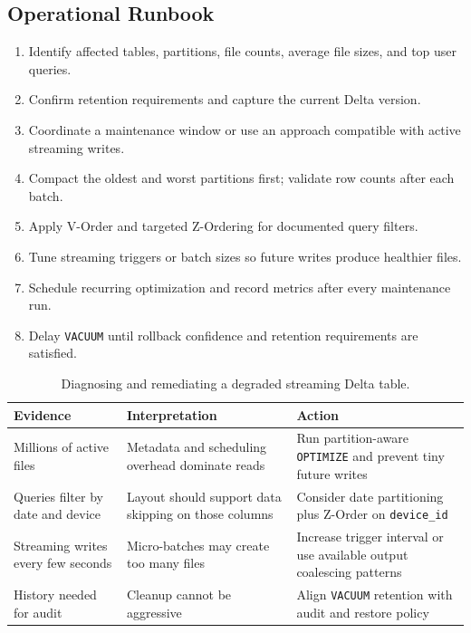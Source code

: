 \subsection{Operational Runbook}
\begin{enumerate}
    \item Identify affected tables, partitions, file counts, average file sizes, and top user queries.
    \item Confirm retention requirements and capture the current Delta version.
    \item Coordinate a maintenance window or use an approach compatible with active streaming writes.
    \item Compact the oldest and worst partitions first; validate row counts after each batch.
    \item Apply V-Order and targeted Z-Ordering for documented query filters.
    \item Tune streaming triggers or batch sizes so future writes produce healthier files.
    \item Schedule recurring optimization and record metrics after every maintenance run.
    \item Delay \texttt{VACUUM} until rollback confidence and retention requirements are satisfied.
\end{enumerate}

\begin{table}[H]
\centering
\small
\begin{tabular}{@{}p{3.4cm}p{4.8cm}p{4.8cm}@{}}
\toprule
\textbf{Evidence} & \textbf{Interpretation} & \textbf{Action} \\
\midrule
Millions of active files & Metadata and scheduling overhead dominate reads & Run partition-aware \texttt{OPTIMIZE} and prevent tiny future writes \\
Queries filter by date and device & Layout should support data skipping on those columns & Consider date partitioning plus Z-Order on \texttt{device\_id} \\
Streaming writes every few seconds & Micro-batches may create too many files & Increase trigger interval or use available output coalescing patterns \\
History needed for audit & Cleanup cannot be aggressive & Align \texttt{VACUUM} retention with audit and restore policy \\
\bottomrule
\end{tabular}
\caption{Diagnosing and remediating a degraded streaming Delta table.}
\label{tab:chapter4-small-file-diagnosis}
\end{table}

